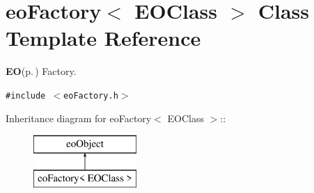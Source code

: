 \section{eo\-Factory$<$ EOClass $>$ Class Template Reference}
\label{classeo_factory}
{\bf EO}{\rm (p.\,\pageref{class_e_o})} Factory.  


{\tt \#include $<$eo\-Factory.h$>$}

Inheritance diagram for eo\-Factory$<$ EOClass $>$::\begin{figure}[H]
\begin{center}
\leavevmode
\includegraphics[height=2cm]{classeo_factory}
\end{center}
\end{figure}
